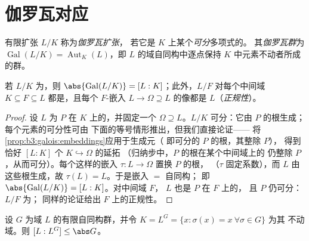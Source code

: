\section{伽罗瓦对应}

\begin{definition}\label{def:b3:galois:galois}
有限扩张 $L/K$ 称为\emph{伽罗瓦扩张}，
若它是 $K$ 上某个\emph{可分}多项式的。
其\emph{伽罗瓦群}为
$\operatorname{Gal}(L/K) = \operatorname{Aut}_K(L)$，即
$L$ 的域自同构中逐点保持 $K$ 中元素不动者所成的群。
\end{definition}

\begin{proposition}\label{prop:b3:galois:galoisorder}
若 $L/K$ 为，则 $\abs{\operatorname{Gal}(L/K)} =
[L:K]$；此外，$L/F$ 对每个中间域 $K
\subseteq F \subseteq L$ 都是，且每个 $F$-嵌入 $L \to \Omega
\supseteq L$ 的像都是 $L$（\emph{正规性}）。
\end{proposition}

\begin{proof}
设 $L$ 为 $P$ 在 $K$ 上的，并固定一个
$\Omega \supseteq L$。$L/K$ 可分：它由
$P$ 的根生成；每个元素的可分性可由
下面的等号情形推出，但我们直接论证——
将\cref{prop:b3:galois:embeddings}应用于生成元（
即可分的 $P$ 的根，其整除 $P$），
得到恰好 $[L:K]$ 个 $K \hookrightarrow \Omega$ 的延拓
（归纳步中，$P$ 的根在某个中间域上的
仍整除 $P$，从而可分）。每个这样的嵌入
$\tau \colon L \to \Omega$ 置换 $P$ 的根，
（$\tau$ 固定系数），而 $L$ 由这些根生成，故 $\tau(L) = L$。于是嵌入
$=$ 自同构；
即 $\abs{\operatorname{Gal}(L/K)} = [L:K]$。对中间域 $F$，
$L$ 也是 $P$ 在 $F$ 上的，
且 $P$ 仍可分：$L/F$ 为；
同样的论证给出 $F$ 上的正规性。
\end{proof}

\begin{lemma}[阿廷]\label{lem:b3:galois:artin}
设 $G$ 为域 $L$ 的有限自同构群，并令
$K = L^G = \{x : \sigma(x) = x\ \forall\sigma \in G\}$ 为其
不动域。则 $[L : L^G] \leq \abs G$。
\end{lemma}

